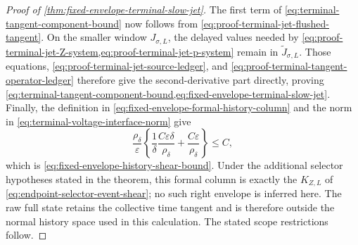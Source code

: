 \begin{proof}[Proof of
\cref{thm:fixed-envelope-terminal-slow-jet}]
The first term of \cref{eq:terminal-tangent-component-bound} now follows
from \cref{eq:proof-terminal-jet-flushed-tangent}.  On the smaller window
\(J_{\sigma,L}\), the delayed values needed by
\cref{eq:proof-terminal-jet-Z-system,eq:proof-terminal-jet-p-system}
remain in \(\widetilde J_{\sigma,L}\).  Those equations,
\cref{eq:proof-terminal-jet-source-ledger}, and
\cref{eq:proof-terminal-tangent-operator-ledger} therefore give the
second-derivative part directly, proving
\cref{eq:terminal-tangent-component-bound,eq:fixed-envelope-terminal-slow-jet}.
Finally, the definition in
\cref{eq:fixed-envelope-formal-history-column} and the norm in
\cref{eq:terminal-voltage-interface-norm} give
\[
 \frac{\rho_\delta}{\varepsilon}
 \left\{\frac1\delta
       \frac{C\varepsilon\delta}{\rho_\delta}
       +\frac{C\varepsilon}{\rho_\delta}\right\}\le C,
\]
which is \cref{eq:fixed-envelope-history-shear-bound}.  Under the additional
selector hypotheses stated in the theorem, this formal column is exactly
the \(K_{Z,L}\) of
\cref{eq:endpoint-selector-event-shear}; no such right envelope is inferred
here.  The raw full state
retains the collective time tangent and is therefore outside the normal
history space used in this calculation.  The stated scope restrictions
follow.
\end{proof}

